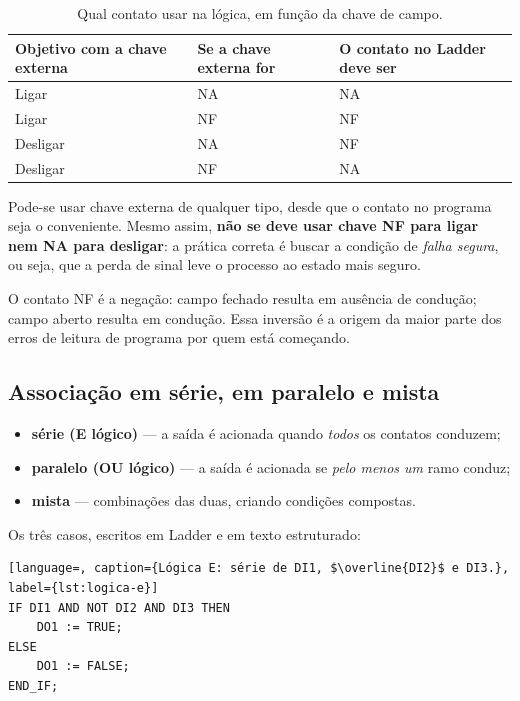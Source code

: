 \begin{table}[H]
  \centering
  \caption{Qual contato usar na lógica, em função da chave de campo.}
  \label{tab:contato-campo}
  \begin{tabular}{l l l}
    \toprule
    Objetivo com a chave externa & Se a chave externa for & O contato no Ladder deve ser \\
    \midrule
    Ligar   & NA & NA \\
    Ligar   & NF & NF \\
    Desligar & NA & NF \\
    Desligar & NF & NA \\
    \bottomrule
  \end{tabular}
\end{table}

Pode-se usar chave externa de qualquer tipo, desde que o contato no programa seja o conveniente.
Mesmo assim, \textbf{não se deve usar chave NF para ligar nem NA para desligar}: a prática correta é
buscar a condição de \emph{falha segura}, ou seja, que a perda de sinal leve o processo ao estado
mais seguro.

O contato NF é a negação: campo fechado resulta em ausência de condução; campo aberto resulta em
condução. Essa inversão é a origem da maior parte dos erros de leitura de programa por quem está
começando.

\subsection{Associação em série, em paralelo e mista}

\begin{itemize}
  \item \textbf{série (E lógico)} --- a saída é acionada quando \emph{todos} os contatos conduzem;
  \item \textbf{paralelo (OU lógico)} --- a saída é acionada se \emph{pelo menos um} ramo conduz;
  \item \textbf{mista} --- combinações das duas, criando condições compostas.
\end{itemize}

Os três casos, escritos em Ladder e em texto estruturado:

\begin{lstlisting}[language=, caption={Lógica E: série de DI1, $\overline{DI2}$ e DI3.}, label={lst:logica-e}]
IF DI1 AND NOT DI2 AND DI3 THEN
    DO1 := TRUE;
ELSE
    DO1 := FALSE;
END_IF;
\end{lstlisting}

